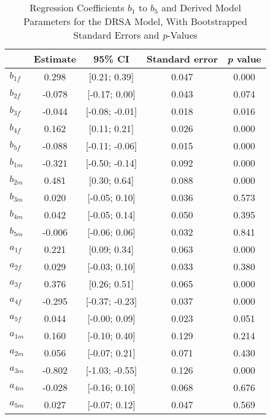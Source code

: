 \documentclass[jou,a4paper,draftfirst]{apa6}
\begin{document}
\begin{table*}
	\caption{Regression Coefficients $b_1$ to $b_5$ and Derived Model Parameters for the DRSA Model, With Bootstrapped Standard Errors and \emph{p}-Values}
	\label{tab:s.full.est}
	\begin{tabular}{lScSS}   
	\hline
    
 & {Estimate} & {95\% CI} & {Standard error} & {\emph{p} value} \\ 
  \hline
$b_{1f}$ & 0.298 & [0.21; 0.39] & 0.047 & 0.000 \\ 
  $b_{2f}$ & -0.078 & [-0.17; 0.00] & 0.043 & 0.074 \\ 
  $b_{3f}$ & -0.044 & [-0.08; -0.01] & 0.018 & 0.016 \\ 
  $b_{4f}$ & 0.162 & [0.11; 0.21] & 0.026 & 0.000 \\ 
  $b_{5f}$ & -0.088 & [-0.11; -0.06] & 0.015 & 0.000 \\ 
  $b_{1m}$ & -0.321 & [-0.50; -0.14] & 0.092 & 0.000 \\ 
  $b_{2m}$ & 0.481 & [0.30; 0.64] & 0.088 & 0.000 \\ 
  $b_{3m}$ & 0.020 & [-0.05; 0.10] & 0.036 & 0.573 \\ 
  $b_{4m}$ & 0.042 & [-0.05; 0.14] & 0.050 & 0.395 \\ 
  $b_{5m}$ & -0.006 & [-0.06; 0.06] & 0.032 & 0.841 \\ 
  $a_{1f}$ & 0.221 & [0.09; 0.34] & 0.063 & 0.000 \\ 
  $a_{2f}$ & 0.029 & [-0.03; 0.10] & 0.033 & 0.380 \\ 
  $a_{3f}$ & 0.376 & [0.26; 0.51] & 0.065 & 0.000 \\ 
  $a_{4f}$ & -0.295 & [-0.37; -0.23] & 0.037 & 0.000 \\ 
  $a_{5f}$ & 0.044 & [-0.00; 0.09] & 0.023 & 0.051 \\ 
  $a_{1m}$ & 0.160 & [-0.10; 0.40] & 0.129 & 0.214 \\ 
  $a_{2m}$ & 0.056 & [-0.07; 0.21] & 0.071 & 0.430 \\ 
  $a_{3m}$ & -0.802 & [-1.03; -0.55] & 0.126 & 0.000 \\ 
  $a_{4m}$ & -0.028 & [-0.16; 0.10] & 0.068 & 0.676 \\ 
  $a_{5m}$ & 0.027 & [-0.07; 0.12] & 0.047 & 0.569 \\ 
   \hline
  
    \end{tabular}
\end{table*}
   
\end{document}
